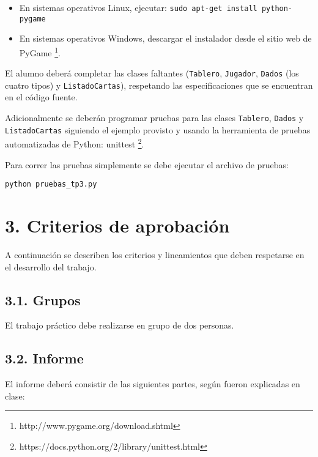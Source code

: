 \documentclass[12pt,spanish,]{article}
\begin{document}
\begin{itemize}
\itemsep1pt\parskip0pt
\item
  En sistemas operativos Linux, ejecutar:
  \texttt{sudo apt-get install python-pygame}
\item
  En sistemas operativos Windows, descargar el instalador desde el sitio
  web de PyGame \footnote{http://www.pygame.org/download.shtml}.
\end{itemize}

El alumno deberá completar las clases faltantes (\texttt{Tablero},
\texttt{Jugador}, \texttt{Dados} (los cuatro tipos) y
\texttt{ListadoCartas}), respetando las especificaciones que se
encuentran en el código fuente.

Adicionalmente se deberán programar pruebas para las clases
\texttt{Tablero}, \texttt{Dados} y \texttt{ListadoCartas} siguiendo el
ejemplo provisto y usando la herramienta de pruebas automatizadas de
Python: unittest \footnote{https://docs.python.org/2/library/unittest.html}.

Para correr las pruebas simplemente se debe ejecutar el archivo de
pruebas:

\begin{verbatim}
python pruebas_tp3.py
\end{verbatim}

\section{3. Criterios de aprobación}\label{criterios-de-aprobaciuxf3n}

A continuación se describen los criterios y lineamientos que deben
respetarse en el desarrollo del trabajo.

\subsection{3.1. Grupos}\label{grupos}

El trabajo práctico debe realizarse en grupo de dos personas.

\subsection{3.2. Informe}\label{informe}

El informe deberá consistir de las siguientes partes, según fueron
explicadas en clase:
\end{document}
